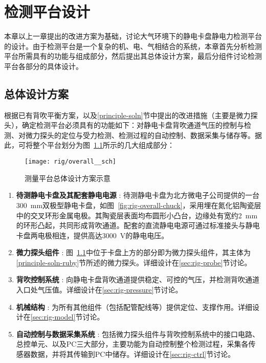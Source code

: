 \chapter{检测平台设计}\label{ch:rig}

本章以上一章提出的改进方案为基础，讨论大气环境下的静电卡盘静电力检测平台的设计。由于检测平台是一个复杂的机、电、气相结合的系统，本章首先分析检测平台所需具有的功能与组成部分，然后提出其总体设计方案，最后分组件讨论检测平台各部分的具体设计。



\section{总体设计方案}\label{sec:rig-overall}

根据已有背吹平衡方案，以及\ref{principle-soln}节中提出的改进措施（主要是微力探头），确定检测平台必须具有的功能如下：对静电卡盘背吹通道气压的控制与检测、对微力探头的定位与受力检测、检测过程的自动控制、数据采集与储存等。据此，可将整个平台划分为图~\ref{fig:rig-overall-sch}所示的几大组成部分：

\begin{figure}[tbh]
\centering
\texttt{[image: rig/overall\_\_sch]}
\caption{测量平台总体设计方案示意}
\label{fig:rig-overall-sch}
\end{figure}

\begin{enumerate}
  \item \textbf{待测静电卡盘及其配套静电电源} :
    待测静电卡盘为北方微电子公司提供的一台\SI{300}{mm}双极型静电卡盘，如图~\ref{fig:rig-overall-chuck}，采用埋在氮化铝陶瓷层中的交叉环形金属电极。其陶瓷层表面均布圆形小凸台，边缘处有宽约\SI{2}{\milli\meter}的环形凸起，共同形成背吹通道。配套的直流静电电源可通过标准接头与静电卡盘两电极相连，提供高达\SI{3000}{\volt}的静电电压。
  \item \textbf{微力探头组件} :
    图~\ref{fig:rig-overall-sch}中位于卡盘上方的部分即为微力探头组件，其主体为\ref{principle-soln-ruby}节所述的微力探头。详细设计在\ref{sec:rig-probe}节讨论。
  \item \textbf{背吹控制系统} :
    向静电卡盘背吹通道提供稳定、可控的气压，并检测背吹通道入口处气压值。详细设计在\ref{sec:rig-pressure}节讨论。
  \item \textbf{机械结构} :
    为所有其他组件（包括配管配线等）提供定位、支撑作用。详细设计在\ref{sec:rig-model}节讨论。
  \item \textbf{自动控制与数据采集系统} :
    包括微力探头组件与背吹控制系统中的接口电路、总控单元、以及PC三大部分，主要功能为自动控制整个检测过程，采集各传感器数据，并将其传输到PC中储存。详细设计在\ref{sec:rig-ctrl}节讨论。
\end{enumerate}

